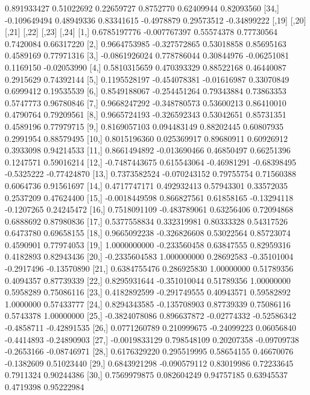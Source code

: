 \documentclass[a4paper,11pt]{scrartcl}
\begin{document}
\begin{Schunk}
\begin{Soutput}
[33,]  0.891933427  0.51022692  0.22659727  0.8752770  0.62409944  0.82093560
[34,] -0.109649494  0.48949336  0.83341615 -0.4978879  0.29573512 -0.34899222
              [,19]        [,20]       [,21]       [,22]      [,23]       [,24]
 [1,]  0.6785197776 -0.007767397  0.55574378  0.77730564  0.7420084  0.66317220
 [2,]  0.9664753985 -0.327572865  0.53018858  0.85695163  0.4589169  0.77971316
 [3,] -0.0861926024  0.778786044  0.30844976 -0.06251081  0.1169150 -0.02053990
 [4,]  0.5810315659  0.470393329  0.88522168  0.46440087  0.2915629  0.74392144
 [5,]  0.1195528197 -0.454078381 -0.01616987  0.33070849  0.6999412  0.19535539
 [6,]  0.8549188067 -0.254451264  0.79343884  0.73863353  0.5747773  0.96780846
 [7,]  0.9668247292 -0.348780573  0.53600213  0.86410010  0.4790764  0.79209561
 [8,]  0.9665724193 -0.326592343  0.53042651  0.85731351  0.4589196  0.77979715
 [9,]  0.8169057103  0.094483149  0.88202445  0.60807935  0.2991954  0.88579495
[10,]  0.8015196360  0.025369917  0.89680911  0.60926912  0.3933098  0.94214533
[11,]  0.8661494892 -0.013690466  0.46850497  0.66251396  0.1247571  0.59016214
[12,] -0.7487443675  0.615543064 -0.46981291 -0.68398495 -0.5325222 -0.77424870
[13,]  0.7373582524 -0.070243152  0.79755754  0.71560388  0.6064736  0.91561697
[14,]  0.4717747171  0.492932413  0.57943301  0.33572035  0.2537209  0.47624400
[15,] -0.0018449598  0.866827561  0.61858165 -0.13294118 -0.1207265  0.24245472
[16,]  0.7518091109 -0.483789061  0.63256406  0.72094868  0.6888692  0.87980836
[17,]  0.5377558834  0.332319981  0.80333328  0.54317526  0.6473780  0.69658155
[18,]  0.9665092238 -0.326826608  0.53022564  0.85723074  0.4590901  0.77974053
[19,]  1.0000000000 -0.233560458  0.63847555  0.82959316  0.4182893  0.82943436
[20,] -0.2335604583  1.000000000  0.28692583 -0.35101004 -0.2917496 -0.13570890
[21,]  0.6384755476  0.286925830  1.00000000  0.51789356  0.4094357  0.87739339
[22,]  0.8295931644 -0.351010044  0.51789356  1.00000000  0.5958289  0.75086116
[23,]  0.4182892599 -0.291749555  0.40943571  0.59582892  1.0000000  0.57433777
[24,]  0.8294343585 -0.135708903  0.87739339  0.75086116  0.5743378  1.00000000
[25,] -0.3824078086  0.896637872 -0.02774332 -0.52586342 -0.4858711 -0.42891535
[26,]  0.0771260789  0.210999675 -0.24099223  0.06056840 -0.4414893 -0.24890903
[27,] -0.0019833129  0.798548109  0.20207358 -0.09709738 -0.2653166 -0.08746971
[28,]  0.6176329220  0.295519995  0.58654155  0.46670076 -0.1382609  0.51023440
[29,]  0.6843921298 -0.090579112  0.83019986  0.72233645  0.7911324  0.90244386
[30,]  0.7569979875  0.082604249  0.94757185  0.63945537  0.4719398  0.95222984

\end{Soutput}
\end{Schunk}
\end{document}

